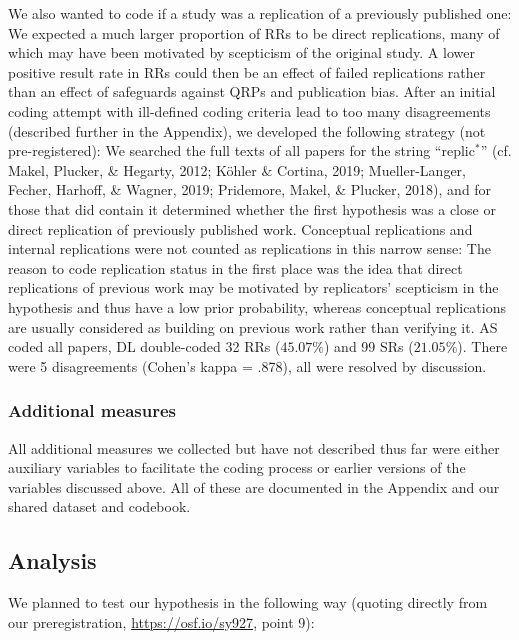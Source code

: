 \documentclass[british,,man,floatsintext]{apa6}
\begin{document}
We also wanted to code if a study was a replication of a previously published one:
We expected a much larger proportion of RRs to be direct replications, many of which may have been motivated by scepticism of the original study.
A lower positive result rate in RRs could then be an effect of failed replications rather than an effect of safeguards against QRPs and publication bias.
After an initial coding attempt with ill-defined coding criteria lead to too many disagreements (described further in the Appendix), we developed the following strategy (not pre-registered):
We searched the full texts of all papers for the string \enquote{replic\(^\ast\)} (cf. Makel, Plucker, \& Hegarty, 2012; Köhler \& Cortina, 2019; Mueller-Langer, Fecher, Harhoff, \& Wagner, 2019; Pridemore, Makel, \& Plucker, 2018), and for those that did contain it determined whether the first hypothesis was a close or direct replication of previously published work.
Conceptual replications and internal replications were not counted as replications in this narrow sense:
The reason to code replication status in the first place was the idea that direct replications of previous work may be motivated by replicators' scepticism in the hypothesis and thus have a low prior probability, whereas conceptual replications are usually considered as building on previous work rather than verifying it.
AS coded all papers, DL double-coded 32 RRs (\(45.07 \%\)) and 99 SRs (\(21.05 \%\)).
There were 5 disagreements (Cohen's kappa = .878), all were resolved by discussion.

\hypertarget{additional-measures}{%
\subsubsection{Additional measures}\label{additional-measures}}

All additional measures we collected but have not described thus far were either auxiliary variables to facilitate the coding process or earlier versions of the variables discussed above.
All of these are documented in the Appendix and our shared dataset and codebook.

\hypertarget{analysis}{%
\subsection{Analysis}\label{analysis}}

We planned to test our hypothesis in the following way (quoting directly from our preregistration, \url{https://osf.io/sy927}, point 9):
\end{document}
